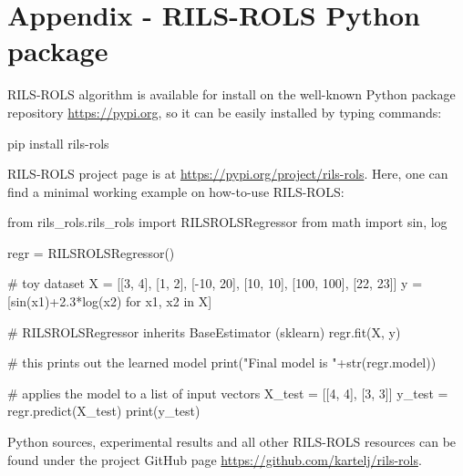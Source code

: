 \documentclass{bmcart}
\begin{document}

\section*{Appendix - \textsc{RILS}-\textsc{ROLS} Python package}\label{sec:appendix-1}

\textsc{RILS-ROLS} algorithm is available for install on the well-known Python package repository \url{https://pypi.org}, so it can be easily installed by typing commands:
\begin{python} 
	pip install rils-rols
\end{python}
\textsc{RILS-ROLS} project page is at \url{https://pypi.org/project/rils-rols}. Here, one can find a minimal working example on how-to-use \textsc{RILS-ROLS}:

\begin{python}
	from rils_rols.rils_rols import RILSROLSRegressor
	from math import sin, log
	
	regr = RILSROLSRegressor()
	
	# toy dataset 
	X = [[3, 4], [1, 2], [-10, 20], [10, 10], [100, 100], [22, 23]]
	y = [sin(x1)+2.3*log(x2) for x1, x2 in X]
	
	# RILSROLSRegressor inherits BaseEstimator (sklearn)
	regr.fit(X, y)
	
	# this prints out the learned model
	print("Final model is "+str(regr.model))
	
	# applies the model to a list of input vectors
	X_test = [[4, 4], [3, 3]]
	y_test = regr.predict(X_test)
	print(y_test) 
\end{python}

Python sources, experimental results and all other \textsc{RILS-ROLS} resources can be found under the project GitHub page \url{https://github.com/kartelj/rils-rols}. 
 

\end{document}
